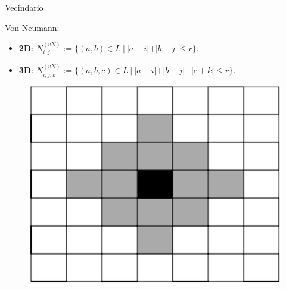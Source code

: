 \begin{frame}{Vecindario}
    \begin{block}{Von Neumann:}
        \begin{minipage}[t]{0.8\linewidth}
            \begin{itemize}
                \item \textbf{2D}: $N_{i,j}^{(vN)}:=\{(a,b) \in L\ |\ |a - i| + |b - j| \leq r\}$.
                \item \textbf{3D}: $N_{i,j, k}^{(vN)}:=\{(a,b,c) \in L\ |\ |a-i| + |b - j| + |c + k| \leq r\}$.
            \end{itemize}
        \end{minipage}%
        \hfill%
        \begin{minipage}[t]{0.2\linewidth}
            \begin{figure}[H]
                \centering
                \includegraphics[width=0.7\linewidth]{pic/01-intro/vn}
            \end{figure}
        \end{minipage}


\end{block}
\end{frame}

